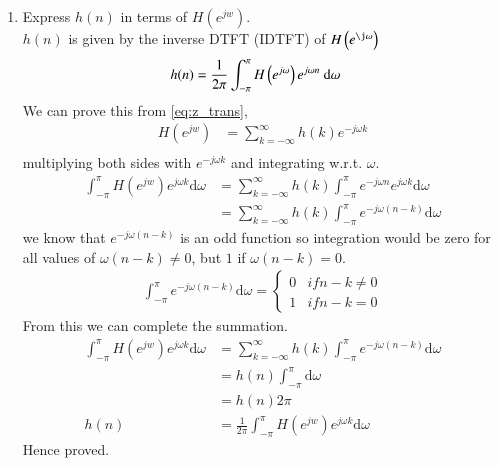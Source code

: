 \documentclass[journal,12pt,twocolumn]{IEEEtran}
\renewcommand\thesection{\arabic{section}}
\begin{document}
\begin{enumerate}[label=\thesection.\arabic*,ref=\thesection.\theenumi]
\item Express $h(n)$ in terms of $H(e^{jw})$.\\
\solution $h(n)$ is given by the inverse DTFT (IDTFT) of $H\brak{e^{\j\omega}}$
\begin{align}
h(n) &= \frac{1}{2\pi} \int_{-\pi}^{\pi} H\left(e^{j\omega}\right) e^{j\omega n} \ \text{d}\omega 
\end{align}
We can prove this from \eqref{eq:z_trans},
\begin{align}
H(e^{jw}) &= \sum_{k=-\infty}^\infty h(k) e^{-j\omega k}\\
\end{align}
multiplying both sides with $e^{-j\omega k}$ and integrating w.r.t. $\omega$.\\
\begin{align}
\int_{-\pi}^{\pi} H(e^{jw}) e^{j\omega k} \text{d}\omega &= \sum_{k=-\infty}^\infty h(k) \int_{-\pi}^{\pi} e^{-j\omega n} e^{j\omega k} \text{d}\omega \\
&= \sum_{k=-\infty}^\infty h(k) \int_{-\pi}^{\pi} e^{-j\omega (n-k)}  \text{d}\omega
\end{align}
we know that $e^{-j\omega (n-k)}$ is an odd function so integration would be zero for all values of $\omega (n-k) \neq 0$, but $1$ if $\omega (n-k) = 0$.\\
\begin{align*}
\int_{-\pi}^{\pi} e^{-j\omega (n-k)}  \text{d}\omega =
\begin{cases}
0 & if n-k \neq 0\\
1 & if n-k = 0
\end{cases}
\end{align*}
From this we can complete the summation.\\

\begin{align}
\int_{-\pi}^{\pi} H(e^{jw}) e^{j\omega k} \text{d}\omega &= \sum_{k=-\infty}^\infty h(k) \int_{-\pi}^{\pi} e^{-j\omega (n-k)}  \text{d}\omega\\
&= h(n) \int_{-\pi}^{\pi} \text{d}\omega\\
& = h(n) 2\pi\\
h(n) &= \frac{1}{2\pi}\int_{-\pi}^{\pi} H(e^{jw}) e^{j\omega k} \text{d}\omega 
\end{align}
Hence proved.\\
\end{enumerate}
\end{document}
